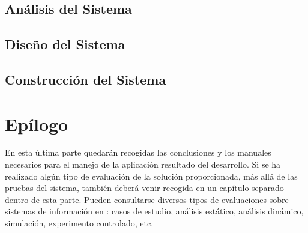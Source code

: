 \documentclass[a4paper,11pt]{book}
\begin{document}
\chapter{Análisis del Sistema}


\chapter{Diseño del Sistema}


\chapter{Construcción del Sistema}


%

\part{Epí­logo}
\null\vfill
\noindent En esta última parte quedarán recogidas las conclusiones y los manuales necesarios para el manejo de la aplicación resultado del desarrollo. Si se ha realizado algún tipo de evaluación de la solución proporcionada, más allá de las pruebas del sistema, también deberá venir recogida en un capí­tulo separado dentro de esta parte. Pueden consultarse diversos tipos de evaluaciones sobre sistemas de información en \cite{hevner2004}: casos de estudio, análisis estático, análisis dinámico, simulación, experimento controlado, etc.
\vfill

%

%

%
\end{document}
